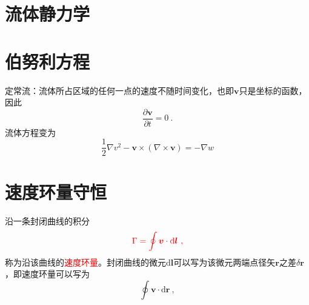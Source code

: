\documentclass[12pt,a4paper]{article}
\renewcommand{\vec}[1]{\boldsymbol{#1}}
\newcommand{\dif}{\mathrm{d}}
\begin{document}
\section{流体静力学}


\section{伯努利方程}
定常流：流体所占区域的任何一点的速度不随时间变化，也即$\vec{v}$只是坐标的函数，因此
\begin{equation*}
\frac{\partial \vec{v}}{\partial t} = 0 ~.
\end{equation*}
流体方程变为
\begin{equation}
\frac{1}{2} \nabla v^2 -\vec{v} \times (\nabla \times \vec{v}) = -\nabla w
\end{equation}


\section{速度环量守恒}
沿一条封闭曲线的积分
\begin{equation}
\color{red} \Gamma = \oint \vec{v} \cdot \dif \vec{l} ~,
\end{equation}
称为沿该曲线的\textcolor{red}{速度环量}。封闭曲线的微元$\dif \vec{l}$可以写为该微元两端点径矢$\vec{r}$之差$\delta \vec{r}$，即速度环量可以写为
\begin{equation}
\oint \vec{v} \cdot \dif \vec{r} ~,
\end{equation}
\end{document}
